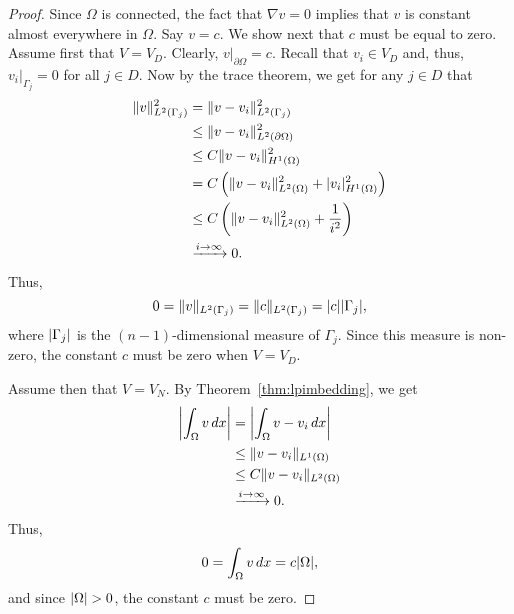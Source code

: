 \documentclass[english, 12pt, a4paper, sci, utf8, a-2b, online]{aaltothesis}
\theoremstyle{definition}
\theoremstyle{plain}
\DeclarePairedDelimiter\abs{\lvert}{\rvert}
\DeclarePairedDelimiter\norm{\lVert}{\rVert}
\newcommand*\diff{\mathop{}\!d}
\numberwithin{equation}{section}
\begin{document}
\begin{proof}
    Since $\Omega$ is connected, the fact that $\nabla v = 0$ implies
    that $v$ is constant almost everywhere in $\Omega$. Say $v = c$.
    We show next that $c$ must be equal to zero. Assume first that $V = V_D$. 
    Clearly, $v|_{\partial \Omega} = c$.
    Recall that $v_i \in V_D$ and, thus, $v_i|_{\Gamma_j} = 0$ for all $j \in D$.
    Now by the trace theorem, we get for any $j \in D$ that
    \begin{align*}
        \norm{v}_{L^2(\Gamma_j)}^2
        &= \norm{v - v_i}_{L^2(\Gamma_j)}^2 \\
        &\leq \norm{v - v_i}_{L^2(\partial \Omega)}^2 \\
        &\leq C \norm{v - v_i}_{H^1(\Omega)}^2 \\
        &= C \left(\norm{v - v_i}_{L^2(\Omega)}^2
            + \abs{v_i}_{H^1(\Omega)}^2 \right) \\
        &\leq C \left(\norm{v - v_i}_{L^2(\Omega)}^2
            + \frac{1}{i^2} \right) \\
        &\xrightarrow[]{i \to \infty} 0.
    \end{align*}
    Thus,
    \begin{equation*}
        0
        = \norm{v}_{L^2(\Gamma_j)}
        = \norm{c}_{L^2(\Gamma_j)}
        = \abs{c} \abs{\Gamma_j},
    \end{equation*}
    where $\abs{\Gamma_j}$ is the $(n-1)$-dimensional measure of $\Gamma_j$.
    Since this measure is non-zero, the constant $c$ must be zero when $V = V_D$.

    Assume then that $V = V_N$. By Theorem~\ref{thm:lpimbedding}, we get
    \begin{align*}
        \abs*{\int_{\Omega} v \diff x}
        &= \abs*{\int_{\Omega} v - v_i \diff x} \\
        &\leq \norm{v - v_i}_{L^1(\Omega)} \\
        &\leq C \norm{v - v_i}_{L^2(\Omega)} \\
        &\xrightarrow[]{i \to \infty} 0.
    \end{align*}
    Thus,
    \begin{equation*}
        0
        = \int_{\Omega} v \diff x
        = c \abs{\Omega},
    \end{equation*}
    and since $\abs{\Omega} > 0$, the constant $c$ must be zero.


\end{proof}
\end{document}
